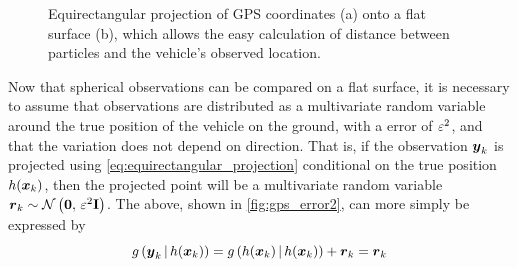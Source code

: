 \begin{knitrout}\small
{}\color{fgcolor}\begin{figure}

{\centering {}

}

\caption[Equirectangular projection of GPS coordinates onto a flat surface]{Equirectangular projection of GPS coordinates ({\sc a}) onto a flat surface ({\sc b}), which allows the easy calculation of distance between particles and the vehicle's observed location.}\label{fig:gps_projection}
\end{figure}


\end{knitrout}


Now that spherical observations can be compared on a flat surface,
it is necessary to assume that \GPS{} observations are distributed
as a multivariate random variable around the true position of the vehicle
on the ground,
with a \GPS{} error of $\varepsilon^2$,
and that the variation does not depend on direction.
That is, if the observation $\boldsymbol{y}_k$ is projected using
\cref{eq:equirectangular_projection} conditional on the true position
$h(\boldsymbol x_k)$,
then the projected point will be a multivariate random variable
$\boldsymbol{r}_k \sim \mathcal{N}\left(\boldsymbol{0},\, \varepsilon^2 \mathbf{I}\right)$.
The above, shown in \cref{fig:gps_error2},
can more simply be expressed by
\begin{equation}
\label{eq:gps_error_model}
g\left(\boldsymbol{y}_k\,|\,h(\boldsymbol x_k)\right) =
    g\left(h(\boldsymbol x_k)\,|\,h(\boldsymbol x_k)\right) + \boldsymbol{r}_k
    = \boldsymbol{r}_k
\end{equation}

